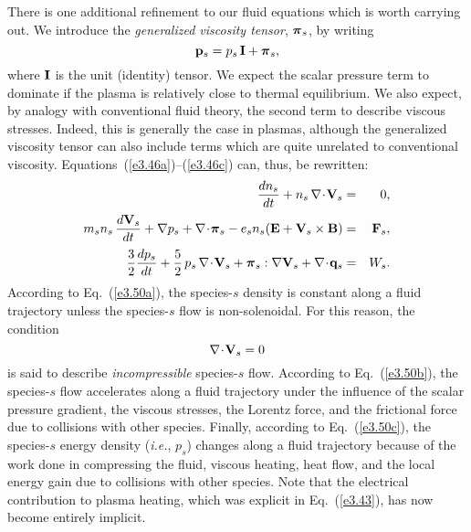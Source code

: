 There is one additional refinement to our fluid equations which is worth
carrying out. We introduce the {\em generalized viscosity tensor}, $\mbox{\boldmath$\pi$}_s$,
by writing
\begin{equation}
{\bf p}_s = p_s\,{\bf I} + \mbox{\boldmath$\pi$}_s,
\end{equation}
where ${\bf I}$ is the unit (identity) tensor. We expect the scalar
pressure term to dominate if the plasma is relatively close to thermal 
equilibrium. We also expect, by analogy with conventional fluid theory,  the
second term to describe viscous stresses. Indeed, this is generally the case
in plasmas, 
although the generalized viscosity tensor can also include terms which are
quite unrelated to conventional viscosity. Equations~(\ref{e3.46a})--(\ref{e3.46c}) can, thus, be rewritten:
\begin{eqnarray}\label{e3.50a}
\frac{dn_s}{dt} + n_s\,\nabla\!\cdot\!{\bf V}_s &=& 0,\\[0.5ex]
m_s n_s\,\frac{d {\bf V}_s}{dt} + \nabla p_s + \nabla\!\cdot \!\bpi_s - e_s n_s
({\bf E} + {\bf V}_s\times {\bf B})& =& {\bf F}_s,\label{e3.50b}\\[0.5ex]
\frac{3}{2}\frac{d p_s}{dt} + \frac{5}{2}\,p_s\,\nabla\!\cdot\!{\bf V}_s
+ \bpi_s:\nabla{\bf V}_s + \nabla\!\cdot\!{\bf q}_s &=& W_s.\label{e3.50c}
\end{eqnarray}
According to Eq.~(\ref{e3.50a}), the species-$s$ density is constant along a fluid
trajectory unless the species-$s$ flow is non-solenoidal. For this reason,
the condition
\begin{equation}
\nabla\!\cdot\!{\bf V}_s = 0
\end{equation}
is said to describe {\em incompressible}\/ species-$s$ flow. According to 
Eq.~(\ref{e3.50b}), the species-$s$ flow accelerates 
along a fluid trajectory under the influence of the
scalar pressure gradient, the viscous stresses, the Lorentz force, and the
frictional force due to collisions with other species. Finally,
according to Eq.~(\ref{e3.50c}), the species-$s$ energy density ({\em i.e.}, $p_s$)
changes along a fluid trajectory
because of the work done in compressing the fluid, viscous heating,
heat flow, and the local energy gain due to collisions with other species.
Note that the electrical contribution to plasma heating, which was explicit
in Eq.~(\ref{e3.43}), has now become entirely implicit. 

